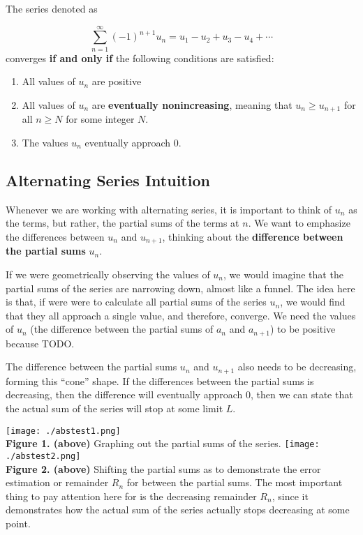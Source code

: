 \documentclass{report}
\begin{document}
\begin{sloppypar}
\begin{center}
{{      The series denoted as

      \[ \sum_{n=1}^{\infty} (-1)^{n+1} u_{n} =
        u_{1} - u_{2} + u_{3} - u_{4} + \cdots \]
      converges \textbf{if and only if} the following
      conditions are satisfied:
      \begin{enumerate}
        \item All values of $ u_{n} $ are positive
        \item All values of $ u_{n} $ are
              \textbf{eventually nonincreasing}, meaning
              that $ u_{n} \geq u_{n+1} $ for all $ n \geq N $
              for some integer $ N $.
        \item The values $ u_{n} $ eventually approach
              0.
      \end{enumerate}


    }
  }
\end{center}

\subsection{Alternating Series Intuition}
Whenever we are working with alternating series, it is
important to think of $ u_{n} $ as the terms, but rather,
the partial sums of the terms at $ n $.
We want to emphasize the differences between $ u_{n} $ and $ u_{n+1}$, thinking about  the \textbf{
  difference between the partial sums}  $ u_{n}$.

\par If we were geometrically observing the
values of $ u_{n} $, we would imagine that the partial
sums of the series are narrowing down, almost like a
funnel. The idea here is that, if were were to
calculate all partial sums of the series $ u_{n} $,
we would find that they all approach a single value,
and therefore, converge. We need the
values of $ u_{n} $ (the difference between the
partial sums of $ a_{n} $ and $ a_{n+1} $) to be positive because TODO.
\par The difference between the partial sums $ u_{n} $ and
$ u_{n+1} $ also needs to be decreasing, forming
this ``cone'' shape. If the differences between the
partial sums is decreasing, then the difference
will eventually approach 0, then we can state
that the actual sum of the series will stop at
some limit $ L $.
\begin{center}
  \texttt{[image: ./abstest1.png]}
  \\
  \textbf{Figure 1. (above)} Graphing out the partial sums of the series.
  \texttt{[image: ./abstest2.png]}
  \\
  \textbf{Figure 2. (above)} Shifting the partial sums as to demonstrate
  the error estimation or remainder $ R_{n}$ for between
  the partial sums. The most important thing to pay
  attention here for is the decreasing remainder $ R_{n} $,
  since it demonstrates how the actual sum of the series
  actually stops decreasing at some point.
\end{center}


\end{sloppypar}
\end{document}
